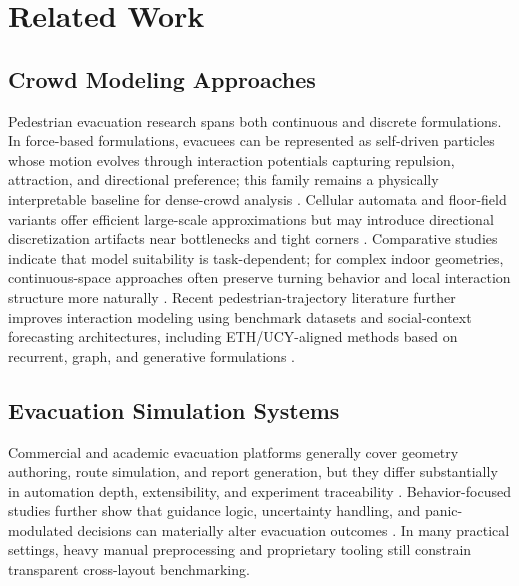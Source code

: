 \documentclass[journal]{IEEEtran}
\begin{document}
\section{Related Work}
\subsection{Crowd Modeling Approaches}
Pedestrian evacuation research spans both continuous and discrete formulations. In force-based formulations, evacuees can be represented as self-driven particles whose motion evolves through interaction potentials capturing repulsion, attraction, and directional preference; this family remains a physically interpretable baseline for dense-crowd analysis \cite{sfm,helbing2000}. Cellular automata and floor-field variants offer efficient large-scale approximations but may introduce directional discretization artifacts near bottlenecks and tight corners \cite{ca,kirchner2002}. Comparative studies indicate that model suitability is task-dependent; for complex indoor geometries, continuous-space approaches often preserve turning behavior and local interaction structure more naturally \cite{zheng2009,duives2013,crowd_book}.
Recent pedestrian-trajectory literature further improves interaction modeling using benchmark datasets and social-context forecasting architectures, including ETH/UCY-aligned methods based on recurrent, graph, and generative formulations \cite{pellegrini2009eth,alahi2016sociallstm,gupta2018socialgan,salzmann2020trajectron,mohamed2020stgcnn,zhou2021astgnn,chen2021intention,li2020recurrent,wang2023timtraj,saleh2022transformer}.

\subsection{Evacuation Simulation Systems}
Commercial and academic evacuation platforms generally cover geometry authoring, route simulation, and report generation, but they differ substantially in automation depth, extensibility, and experiment traceability \cite{path_planning,ronchi2015,lovreglio2020}. Behavior-focused studies further show that guidance logic, uncertainty handling, and panic-modulated decisions can materially alter evacuation outcomes \cite{pan2007,chen2018}. In many practical settings, heavy manual preprocessing and proprietary tooling still constrain transparent cross-layout benchmarking.
\end{document}
